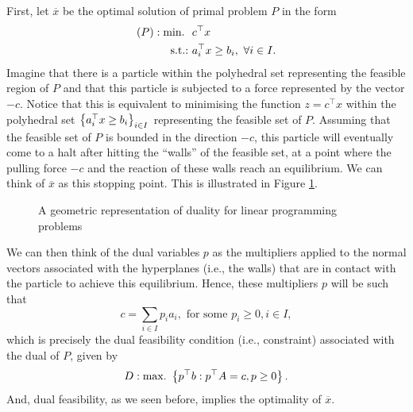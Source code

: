 First, let $\overline{x}$ be the optimal solution of primal problem $P$ in the form
%
\begin{align*}
	(P) : \mathop{\text{min.~}} \ & c^\top x \\
	\mathop{\text{s.t.:~}} & a_i^\top x \geq b_i, \ \forall i \in I.
\end{align*}
%
Imagine that there is a particle within the polyhedral set representing the feasible region of $P$ and that this particle is subjected to a force represented by the vector $-c$. Notice that this is equivalent to minimising the function $z = c^\top x$ within the polyhedral set $\left\{ a_i^\top x \geq b_i \right \}_{i\in I}$ representing the feasible set of $P$. Assuming that the feasible set of $P$ is bounded in the direction $-c$, this particle will eventually come to a halt after hitting the ``walls'' of the feasible set, at a point where the pulling force $-c$ and the reaction of these walls reach an equilibrium. We can think of $\overline{x}$ as this stopping point. This is illustrated in Figure \ref{p1c5:fig:duality_geometry}.

\begin{figure}[h]
	\caption{A geometric representation of duality for linear programming problems} \label{p1c5:fig:duality_geometry}	
\end{figure}

We can then think of the dual variables $p$ as the multipliers applied to the normal vectors associated with the hyperplanes (i.e., the walls) that are in contact with the particle to achieve this equilibrium. Hence, these multipliers $p$ will be such that
%
\begin{equation*}
c = \sum_{i \in I}p_ia_i, \text{ for some } p_i \geq 0, i \in I,	
\end{equation*}
%
which is precisely the dual feasibility condition (i.e., constraint) associated with the dual of $P$, given by
%
\begin{equation*}
	D : \mathop{\text{max.~}} \left\{ p^\top b : p^\top A = c, p \geq 0 \right \}.	
\end{equation*}
%
And, dual feasibility, as we seen before, implies the optimality of $\overline{x}$. 


